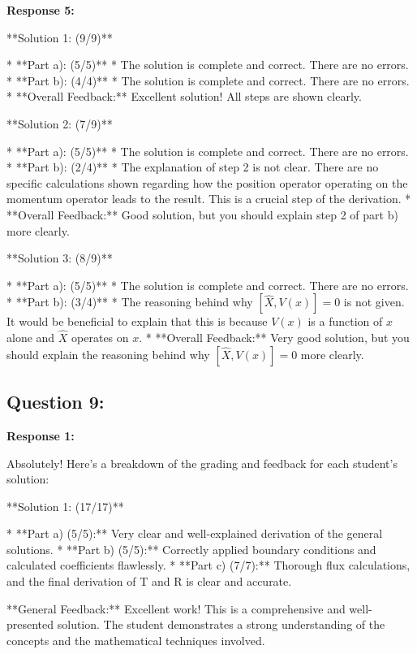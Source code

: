 \documentclass[a4paper,11pt]{article}
\begin{document}
\bigskip    
\textbf{Response 5:}

**Solution 1: (9/9)**

*   **Part a): (5/5)**
    *   The solution is complete and correct. There are no errors.
*   **Part b): (4/4)**
    *   The solution is complete and correct. There are no errors.
*   **Overall Feedback:** Excellent solution! All steps are shown clearly.

**Solution 2: (7/9)**

*   **Part a): (5/5)**
    *   The solution is complete and correct. There are no errors.
*   **Part b): (2/4)**
    *   The explanation of step 2 is not clear. There are no specific calculations shown regarding how the position operator operating on the momentum operator leads to the result. This is a crucial step of the derivation.
*   **Overall Feedback:** Good solution, but you should explain step 2 of part b) more clearly.

**Solution 3: (8/9)**

*   **Part a): (5/5)**
    *   The solution is complete and correct. There are no errors.
*   **Part b): (3/4)**
    *   The reasoning behind why \(\left[ \hat{X}, V(x)\right] = 0\) is not given. It would be beneficial to explain that this is because \(V(x)\) is a function of \(x\) alone and \(\hat{X}\) operates on \(x\).
*   **Overall Feedback:** Very good solution, but you should explain the reasoning behind why \(\left[ \hat{X}, V(x)\right] = 0\) more clearly.

\subsection*{Question 9:}

\textbf{Response 1:}

Absolutely! Here's a breakdown of the grading and feedback for each student's solution:

**Solution 1: (17/17)**

*   **Part a) (5/5):** Very clear and well-explained derivation of the general solutions.
*   **Part b) (5/5):**  Correctly applied boundary conditions and calculated coefficients flawlessly.
*   **Part c) (7/7):** Thorough flux calculations, and the final derivation of T and R is clear and accurate.

**General Feedback:** Excellent work! This is a comprehensive and well-presented solution. The student demonstrates a strong understanding of the concepts and the mathematical techniques involved.
\end{document}
